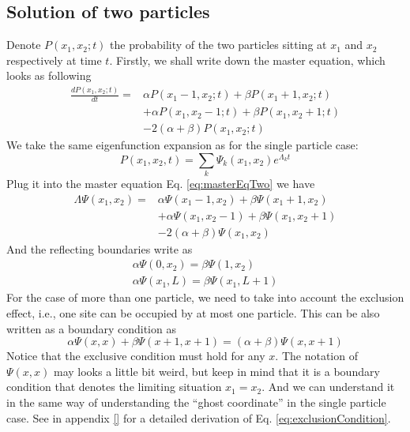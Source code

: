 \subsection{Solution of two particles}
\label{sub:solution_of_two_particles}
Denote $P(x_1,x_2;t)$ the probability of the two particles sitting at $x_1$ and $x_2$ respectively at time $t$. Firstly, we shall write down the master equation, which looks as following
\begin{equation}
    \begin{aligned}
    \label{eq:masterEqTwo}
    \frac{d P(x_1, x_2; t)}{dt} = & \alpha P(x_1-1,x_2;t) + \beta P(x_1+1,x_2;t) \\ 
    & + \alpha P(x_1, x_2-1; t) + \beta P(x_1, x_2+1; t)  \\ 
    & - 2(\alpha+\beta)P(x_1, x_2; t)
    \end{aligned}
\end{equation}
We take the same eigenfunction expansion as for the single particle case:
\begin{equation}
    \label{eq:solutionTwo}
    P(x_1, x_2, t) = \sum_{k} \Psi_{k}(x_1, x_2) e^{\Lambda_k t}
\end{equation}
Plug it into the master equation Eq. \eqref{eq:masterEqTwo} we have
\begin{equation}
    \begin{aligned}
    \label{eq:eigenModesTwo}
    \Lambda \Psi(x_1, x_2) = & \alpha \Psi(x_1-1, x_2) + \beta \Psi(x_1+1, x_2)
    \\ &+ \alpha \Psi(x_1, x_2-1) + \beta \Psi(x_1, x_2+1) \\ 
    &- 2(\alpha+\beta)\Psi(x_1, x_2)
    \end{aligned}
\end{equation}
And the reflecting boundaries write as
\begin{subequations}
    \label{eq:boundaries-two-particles}
    \begin{align}
        \alpha \Psi(0,x_2) = \beta \Psi(1, x_2) \\
        \alpha \Psi(x_1, L) = \beta \Psi(x_1, L+1)
    \end{align}
\end{subequations}
For the case of more than one particle, we need to take into account the exclusion effect, i.e., one site can be occupied by at most one particle. This can be also written as a boundary condition as 
\begin{equation}
    \label{eq:exclusionCondition}
    \alpha \Psi(x, x) + \beta \Psi(x+1, x+1) = (\alpha + \beta) \Psi(x, x+1)
\end{equation}
Notice that the exclusive condition must hold for any $x$. The notation of $\Psi(x, x)$ may looks a little bit weird, but keep in mind that it is a boundary condition that denotes the limiting situation $x_1=x_2$. And we can understand it in the same way of understanding the ``ghost coordinate'' in the single particle case. See in appendix \ref{} for a detailed derivation of Eq. \eqref{eq:exclusionCondition}. 

